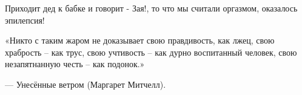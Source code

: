  
 
 
 
 

Приходит дед к бабке и говорит - Зая!, то что мы считали оргазмом, оказалось эпилепсия!

«Никто с таким жаром не доказывает свою правдивость, как лжец, свою храбрость –
как трус, свою учтивость – как дурно воспитанный человек, свою незапятнанную
честь – как подонок.»

— Унесённые ветром (Маргарет Митчелл).







